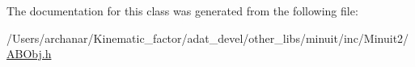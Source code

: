 The documentation for this class was generated from the following file\+:\begin{DoxyCompactItemize}
\item 
/\+Users/archanar/\+Kinematic\+\_\+factor/adat\+\_\+devel/other\+\_\+libs/minuit/inc/\+Minuit2/\mbox{\hyperlink{other__libs_2minuit_2inc_2Minuit2_2ABObj_8h}{A\+B\+Obj.\+h}}\end{DoxyCompactItemize}

